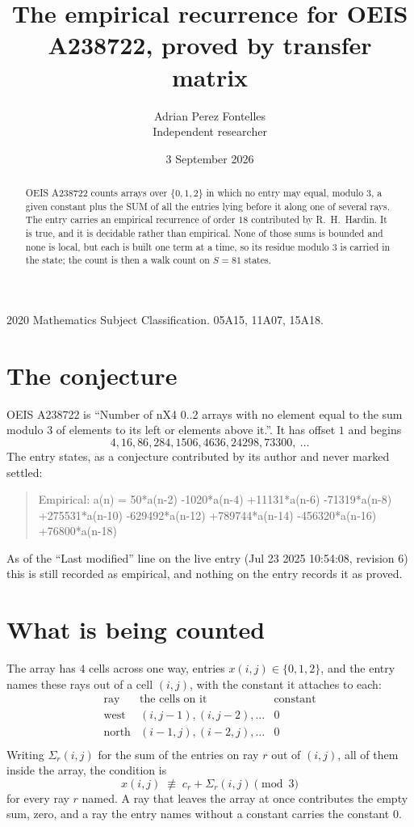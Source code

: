 \documentclass[11pt,a4paper]{article}
\title{The empirical recurrence for OEIS A238722, proved by transfer matrix}
\author{Adrian Perez Fontelles\\ \small Independent researcher}
\date{3 September 2026}
\theoremstyle{plain}
\theoremstyle{definition}
\begin{document}
\maketitle

\begin{abstract}
OEIS A238722 counts arrays over $\{0,1,2\}$ in which no entry may equal, modulo $3$, a given
constant plus the SUM of all the entries lying before it along one of several rays. The entry
carries an empirical recurrence of order $18$ contributed by R.~H.~Hardin. It is true, and
it is decidable rather than empirical. None of those sums is bounded and none is local, but
each is built one term at a time, so its residue modulo $3$ is carried in the state; the
count is then a walk count on $S=81$ states.
\end{abstract}

\noindent\small 2020 Mathematics Subject Classification. 05A15, 11A07, 15A18.\normalsize

\section{The conjecture}

OEIS A238722 is ``Number of nX4 0..2 arrays with no element equal to the sum modulo 3 of elements to its left or elements above it.''. It has offset $1$ and begins
\[
4, 16, 86, 284, 1506, 4636, 24298, 73300,\ \dots
\]
The entry states, as a conjecture contributed by its author and never marked settled:
\begin{quote}
Empirical: a(n) = 50*a(n-2) -1020*a(n-4) +11131*a(n-6) -71319*a(n-8) +275531*a(n-10) -629492*a(n-12) +789744*a(n-14) -456320*a(n-16) +76800*a(n-18)
\end{quote}
As of the ``Last modified'' line on the live entry (Jul 23 2025 10:54:08, revision 6) this is still
recorded as empirical, and nothing on the entry records it as proved.

\section{What is being counted}

The array has $4$ cells across one way, entries $x(i,j)\in\{0,1,2\}$, and the entry names these
rays out of a cell $(i,j)$, with the constant it attaches to each:
\[
\begin{array}{lll}
\text{ray} & \text{the cells on it} & \text{constant} \\[2pt]
\text{west} & (i,j-1),(i,j-2),\dots & 0 \\
\text{north} & (i-1,j),(i-2,j),\dots & 0 \\
\end{array}
\]
Writing $\Sigma_r(i,j)$ for the sum of the entries on ray $r$ out of $(i,j)$, all of them
inside the array, the condition is
\[
x(i,j)\;\not\equiv\;c_r+\Sigma_r(i,j) \pmod{3}
\]
for every ray $r$ named. A ray that leaves the array at once contributes the empty sum,
zero, and a ray the entry names without a constant carries the constant $0$.
\end{document}

